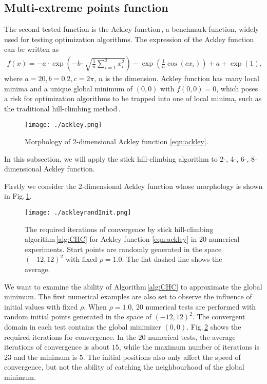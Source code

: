 \documentclass[mathpazo]{aamm}
\newcommand{\bmx}{x}
\begin{document}
\subsection{Multi-extreme points function}
\label{subsec:minmulit}

The second tested function is the Ackley
function\,\cite{dieterich2012empirical},
a benchmark function, widely used for
testing optimization algorithms.
The expression of the Ackley function can be written as
\begin{align}
	f(\bmx) =
	-a\cdot\exp\left(-b\cdot\sqrt{\frac{1}{n}\sum_{i=1}^2
	x_i^2}\right)-
	\exp\left(\frac{1}{n}\cos(c x_i)\right)+a+\exp(1),
	\label{eqn:ackley}
\end{align}
where $a=20, b=0.2, c=2\pi$, $n$ is the dimension.
Ackley function has many local minima and a unique global
minimum of $(0,0)$ with $f(0,0)=0$, which poses a risk for
optimization algorithms to be trapped into one of local
minima, such as the traditional hill-climbing method\,\cite{back1996evolutionary}.
\begin{figure}[!htbp]
	\centering
	  \texttt{[image: ./ackley.png]}
	  \caption{Morphology of 2-dimensional Ackley function \eqref{eqn:ackley}.}
\label{fig:ackley}
\end{figure}
In this subsection, we will apply the stick hill-climbing
algorithm to 2-, 4-, 6-, 8-dimensional Ackley function. 

Firstly we consider the 2-dimensional Ackley function whose   
morphology is shown in Fig.\,\ref{fig:ackley}.
\begin{figure}[!htbp]
	\centering
	\texttt{[image: ./ackleyrandInit.png]}
	  \caption{The required iterations of convergence by stick hill-climbing
	  algorithm\,\ref{alg:CHC} for Ackley function
	  \eqref{eqn:ackley} in 20 numerical experiments. 
	  Start points are randomly generated in the space
	  $(-12, 12)^2$ with fixed $\rho=1.0$.
	  The flat dashed line shows the average.} 
	  \label{fig:ackley:randInit}
\end{figure}
We want to examine the ability of Algorithm\,\ref{alg:CHC} to
approximate the global minimum. The first numerical
examples are also set to observe the influence of initial values
with fixed $\rho$. 
When $\rho=1.0$, $20$ numerical tests are performed with
random initial points generated in the space of $(-12, 12)^2$.
The convergent domain in each test contains the global minimizer $(0,0)$.
Fig.\,\ref{fig:ackley:randInit} shows the required iterations
for convergence. In the $20$ numerical tests, the average iterations of
convergence is about $15$, while the maximum number of
iterations is $23$ and the minimum is $5$. 
The initial positions also only affect the
speed of convergence, but not the ability of catching the
neighbourhood of the global minimum.
\end{document}
